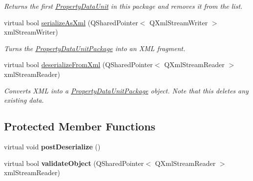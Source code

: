 \begin{DoxyCompactItemize}
\begin{DoxyCompactList}\small\item\em Returns the first \hyperlink{class_picto_1_1_property_data_unit}{Property\-Data\-Unit} in this package and removes it from the list. \end{DoxyCompactList}\item 
\hypertarget{class_picto_1_1_property_data_unit_package_a428f2dc74ecbbc0a8d88a34af6748324}{virtual bool \hyperlink{class_picto_1_1_property_data_unit_package_a428f2dc74ecbbc0a8d88a34af6748324}{serialize\-As\-Xml} (Q\-Shared\-Pointer$<$ Q\-Xml\-Stream\-Writer $>$ xml\-Stream\-Writer)}\label{class_picto_1_1_property_data_unit_package_a428f2dc74ecbbc0a8d88a34af6748324}

\begin{DoxyCompactList}\small\item\em Turns the \hyperlink{class_picto_1_1_property_data_unit_package}{Property\-Data\-Unit\-Package} into an X\-M\-L fragment. \end{DoxyCompactList}\item 
\hypertarget{class_picto_1_1_property_data_unit_package_a87508d1a33e09bc508a34f0b7912aade}{virtual bool \hyperlink{class_picto_1_1_property_data_unit_package_a87508d1a33e09bc508a34f0b7912aade}{deserialize\-From\-Xml} (Q\-Shared\-Pointer$<$ Q\-Xml\-Stream\-Reader $>$ xml\-Stream\-Reader)}\label{class_picto_1_1_property_data_unit_package_a87508d1a33e09bc508a34f0b7912aade}

\begin{DoxyCompactList}\small\item\em Converts X\-M\-L into a \hyperlink{class_picto_1_1_property_data_unit_package}{Property\-Data\-Unit\-Package} object. Note that this deletes any existing data. \end{DoxyCompactList}\end{DoxyCompactItemize}
\subsection*{Protected Member Functions}
\begin{DoxyCompactItemize}
\item 
\hypertarget{class_picto_1_1_property_data_unit_package_ad72ef0898a4a49732144c8dfb8b5e943}{virtual void {\bfseries post\-Deserialize} ()}\label{class_picto_1_1_property_data_unit_package_ad72ef0898a4a49732144c8dfb8b5e943}

\item 
\hypertarget{class_picto_1_1_property_data_unit_package_adc8f00b8e9f4408847f8144936913d8f}{virtual bool {\bfseries validate\-Object} (Q\-Shared\-Pointer$<$ Q\-Xml\-Stream\-Reader $>$ xml\-Stream\-Reader)}\label{class_picto_1_1_property_data_unit_package_adc8f00b8e9f4408847f8144936913d8f}

\end{DoxyCompactItemize}
